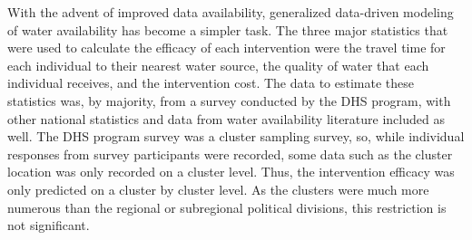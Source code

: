 With the advent of improved data availability, generalized data-driven modeling of water availability has become a simpler task. The three major statistics that were used to calculate the efficacy of each intervention were the travel time for each individual to their nearest water source, the quality of water that each individual receives, and the intervention cost. The data to estimate these statistics was, by majority, from a survey conducted by the DHS program, with other national statistics and data from water availability literature included as well. 
The DHS program survey was a cluster sampling survey, so, while individual responses from survey participants were recorded, some data such as the cluster location was only recorded on a cluster level. Thus, the intervention efficacy was only predicted on a cluster by cluster level. As the clusters were much more numerous than the regional or subregional political divisions, this restriction is not significant.
